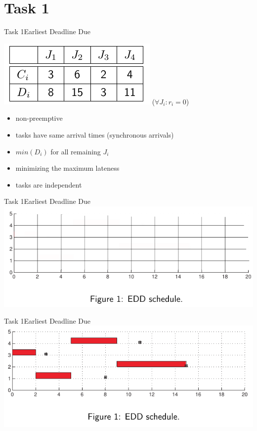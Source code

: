 
\section{Task 1}

\setcounter{task}{1}

\begin{frame}{Task 1}{Earliest Deadline Due}
  \vspace{0.5cm}
  \begin{task}
    \centering
    \includegraphics[height=0.2\paperheight]{./figures/1_tab.png}
    ($\forall J_i: r_i = 0$)
  \end{task}
  \begin{requirements}
    \begin{itemize}
      \item \alert{non-preemptive}
      \item tasks have \alert{same arrival times} (synchronous arrivals)
      \item $min(D_i)$ for all remaining $J_i$
      \item \alert{minimizing} the \alert{maximum lateness}
      \item tasks are \alert{independent}
    \end{itemize}
    \centering
  \end{requirements}
\end{frame}

\begin{frame}{Task 1}{Earliest Deadline Due}
  \includegraphics[width=\textwidth]{./figures/1_empty.png}
\end{frame}

\begin{frame}{Task 1}{Earliest Deadline Due}
  \includegraphics[width=\textwidth]{./figures/1_sol.png}
\end{frame}
